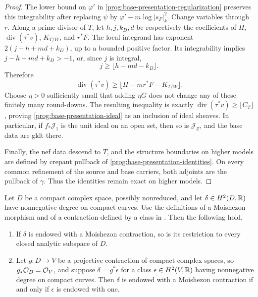 \begin{proof}
The lower bound on $\varphi'$ in
\eqref{prog:base-presentation-regularization} preserves this
integrability after replacing $\psi$ by
$\varphi'-m\log|s_F|_k^2$. Change variables through $r$. Along a
prime divisor of $T$, let $h,j,k_D,d$ be respectively the coefficients
of $H$, $\operatorname{div}(\tau^*v)$, $K_{T/W}$, and $r^*F$.
The local integrand has exponent
$2(j-h+md+k_D)$, up to a bounded positive factor. Its integrability
implies $j-h+md+k_D>-1$, or, since $j$ is integral,
\[
 j\geq\lfloor h-md-k_D\rfloor.
\]
Therefore
\[
 \operatorname{div}(\tau^*v)
       \geq\lfloor H-mr^*F-K_{T/W}\rfloor.
\]
Choose $\eta>0$ sufficiently small that adding $\eta G$ does not
change any of these finitely many round-downs. The resulting
inequality is exactly
$\operatorname{div}(\tau^*v)\geq\lfloor C_T\rfloor$, proving
\eqref{prog:base-presentation-ideal} as an inclusion of ideal sheaves.
In particular, if $f_*\mathcal J_1$ is the unit ideal on an open set,
then so is $\mathcal J_Z$, and the base data are gklt there.

Finally, the nef data descend to $T$, and the structure boundaries
on higher models are defined by crepant pullback of
\eqref{prog:base-presentation-identities}. On every common refinement
of the source and base carriers, both adjoints are the pullback of
$\gamma$. Thus the identities remain exact on higher models.
\end{proof}

\begin{lemma}
\label{prog:base-emc}
Let $D$ be a compact complex space, possibly nonreduced, and let
$\delta\in H^2(D,\mathbb R)$ have nonnegative degree on compact curves.
Use the definitions of a Moishezon morphism and of a contraction
defined by a class in \cite[Definitions~2.32 and~2.34]{HX}.
Then the following hold.
\begin{enumerate}
\item If $\delta$ is endowed with a Moishezon contraction, so is
its restriction to every closed analytic subspace of $D$.
\item Let $g:D\to V$ be a projective contraction of compact
complex spaces, so $g_*\mathcal O_D=\mathcal O_V$, and suppose
$\delta=g^*\epsilon$ for a class $\epsilon\in H^2(V,\mathbb R)$
having nonnegative degree on compact curves. Then $\delta$ is
endowed with a Moishezon contraction if and only if $\epsilon$
is endowed with one.
\end{enumerate}
\end{lemma}

